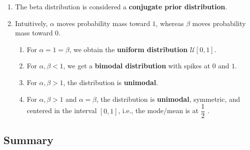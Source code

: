 \begin{enumerate}
    \item The beta distribution is considered a \textbf{conjugate prior distribution}.
    \hfill \cite{statistics/book/Statistics-for-Data-Scientists/Maurits-Kaptein}

    \item Intuitively, $\alpha$ moves probability mass toward $1$, whereas $\beta$ moves probability mass toward $0$.
    \hfill \cite{mfml/book/mml/Deisenroth-Faisal-Ong}
    \begin{enumerate}
        \item For $\alpha = 1 = \beta$, we obtain the \textbf{uniform distribution} $\mathcal{U}[0, 1]$.
        \hfill \cite{mfml/book/mml/Deisenroth-Faisal-Ong}

        \item For $\alpha, \beta < 1$, we get a \textbf{bimodal distribution} with spikes at $0$ and $1$.
        \hfill \cite{mfml/book/mml/Deisenroth-Faisal-Ong}

        \item For $\alpha, \beta > 1$, the distribution is \textbf{unimodal}.
        \hfill \cite{mfml/book/mml/Deisenroth-Faisal-Ong}

        \item For $\alpha, \beta > 1$ and $\alpha = \beta$, the distribution is \textbf{unimodal}, symmetric, and centered in the interval $[0, 1]$, i.e., the mode/mean is at $\dfrac{1}{2}$ .
        \hfill \cite{mfml/book/mml/Deisenroth-Faisal-Ong}
    \end{enumerate}
\end{enumerate}



\subsection{Summary}

